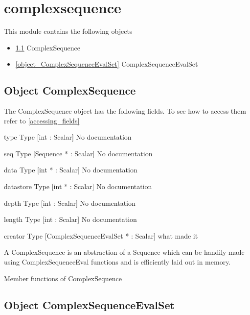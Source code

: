 \section{complexsequence}
\label{module_complexsequence}
This module contains the following objects

\begin{itemize}
\item \ref{object_ComplexSequence} ComplexSequence

\item \ref{object_ComplexSequenceEvalSet} ComplexSequenceEvalSet

\end{itemize}
\subsection{Object ComplexSequence}

\label{object_ComplexSequence}

The ComplexSequence object has the following fields. To see how to access them refer to \ref{accessing_fields}
\begin{description}
\item{type} Type [int : Scalar] No documentation

\item{seq} Type [Sequence * : Scalar] No documentation

\item{data} Type [int * : Scalar] No documentation

\item{datastore} Type [int * : Scalar] No documentation

\item{depth} Type [int : Scalar] No documentation

\item{length} Type [int : Scalar] No documentation

\item{creator} Type [ComplexSequenceEvalSet * : Scalar]  what made it

\end{description}
A ComplexSequence is an abstraction of a 
Sequence which can be handily made using
ComplexSequenceEval functions and is efficiently
laid out in memory.




Member functions of ComplexSequence

\subsection{Object ComplexSequenceEvalSet}

